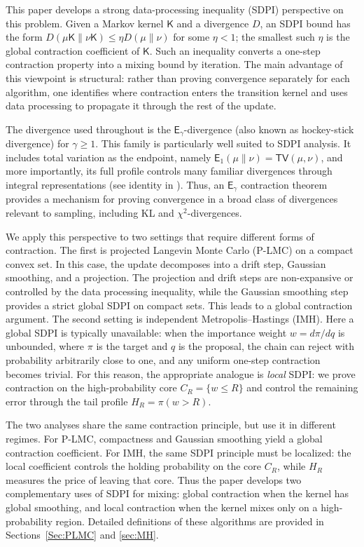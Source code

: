 \documentclass[10pt, journal]{IEEEtran}
\makeatletter
\def\eqref#1{equation~\ref{#1}}
\renewcommand{\eqref}[1]{\textup{\tagform@{\ref{#1}}}}
\newcommand{\sK}{\mathsf{K}}
\makeatother
\begin{document}
This paper develops a strong data-processing inequality (SDPI) perspective on this problem. Given a Markov kernel $\sK$ and a divergence $D$, an SDPI bound has the form $D(\mu\sK\|\nu\sK)\le \eta D(\mu\|\nu)$ for some $\eta<1$; the smallest such $\eta$ is the global contraction coefficient of $\sK$.  Such an inequality converts a one-step contraction property into a mixing bound by iteration. The main advantage of this viewpoint is structural: rather than proving convergence separately for each algorithm, one identifies where contraction enters the transition kernel and uses data processing to propagate it through the rest of the update.

The divergence used throughout is the $\mathsf E_\gamma$-divergence (also known as hockey-stick divergence) for $\gamma\ge1$. This family is particularly well suited to SDPI analysis. It includes total variation as the endpoint, namely $\mathsf E_1(\mu\|\nu)=\mathsf{TV}(\mu, \nu)$, and more  importantly, its full profile controls many familiar divergences through integral representations (see identity in \eqref{f_representation}). Thus, an $\mathsf E_\gamma$ contraction theorem provides a mechanism for proving convergence in a broad class of divergences relevant to sampling, including KL and $\chi^2$-divergences.

We apply this perspective to two settings that require different forms of contraction. The first is projected Langevin Monte Carlo (P-LMC) on a compact convex set. In this case, the update decomposes into a drift step, Gaussian smoothing, and a projection. The projection and drift steps are non-expansive or controlled by the data processing inequality, while the Gaussian smoothing step provides a strict global SDPI on compact sets. This leads to a global contraction argument. The second setting is independent Metropolis--Hastings (IMH). Here a global SDPI is typically unavailable: when the importance weight $w=d\pi/dq$ is unbounded, where $\pi$ is the target and $q$ is the proposal, the chain can reject with probability arbitrarily close to one, and any uniform one-step contraction becomes trivial. For this reason, the appropriate analogue is \textit{local} SDPI: we prove contraction on the high-probability core $C_R=\{w\le R\}$ and control the remaining error through the tail profile $H_R=\pi(w>R)$.

The two analyses share the same contraction principle, but use it in different regimes. For P-LMC, compactness and Gaussian smoothing yield a global contraction coefficient. For IMH, the same SDPI principle must be localized: the local coefficient controls the holding probability on the core $C_R$, while $H_R$ measures the price of leaving that core. Thus the paper develops two complementary uses of SDPI for mixing: global contraction when the kernel has global smoothing, and local contraction when the kernel mixes only on a high-probability region. Detailed definitions of these algorithms are provided in Sections~\ref{Sec:PLMC} and \ref{sec:MH}.
\end{document}
